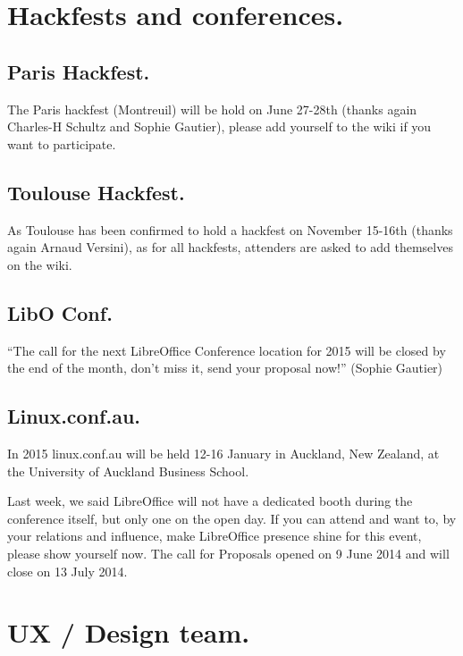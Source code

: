 \documentclass{article}
\begin{document}
\section{Hackfests and conferences.}

\subsection{Paris Hackfest.}

The Paris hackfest (Montreuil) will be hold on June 27-28th (thanks
again Charles-H Schultz and Sophie Gautier), please add yourself to the wiki if you want to participate\cite{parisHackfestWiki}.

\subsection{Toulouse Hackfest.}

As Toulouse has been confirmed to hold a hackfest on November 15-16th (thanks again Arnaud Versini), as for all hackfests, attenders are asked to add themselves on the wiki\cite{hackfestToulouseWiki}.

\subsection{LibO Conf.}

``The call for the next LibreOffice Conference location for 2015 will be
closed by the end of the month, don't miss it, send your proposal now!'' (Sophie Gautier) \cite{liboConf2015}

\subsection{Linux.conf.au.}

In 2015 linux.conf.au will be held 12-16 January in Auckland, New Zealand, at
the University of Auckland Business School. 

Last week, we said LibreOffice will not have a dedicated booth during the conference itself, but only one on the open day\cite{linuxConfAuckland2}. If you can attend and want to, by your relations and influence, make LibreOffice presence shine for this event, please show yourself now. The call for Proposals opened on 9 June 2014 and will close on 13 July 2014\cite{linuxConfAuckland1}. 



\section{UX / Design team.}
\end{document}
